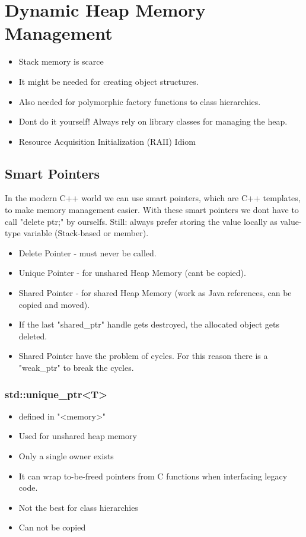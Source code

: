 \section{Dynamic Heap Memory Management}
\begin{itemize}
  \itemsep -0.5em 
  \item Stack memory is scarce
  \item It might be needed for creating object structures.
  \item Also needed for polymorphic factory functions to class hierarchies.
  \item Dont do it yourself! Always rely on library classes for managing the heap.
  \item Resource Acquisition Initialization (RAII) Idiom
\end{itemize}

\subsection{Smart Pointers}
In the modern C++ world we can use smart pointers, which are C++ templates, to make memory management easier. With these smart pointers we dont have to call "delete ptr;" by ourselfs. Still: always prefer storing the value locally as value-type variable (Stack-based or member).
\begin{itemize}
  \itemsep -0.5em 
  \item Delete Pointer - must never be called.
  \item Unique Pointer - for unshared Heap Memory (cant be copied).
  \item Shared Pointer - for shared Heap Memory (work as Java references, can be copied and moved).
  \item If the last "shared\_ptr" handle gets destroyed, the allocated object gets deleted.
  \item Shared Pointer have the problem of cycles. For this reason there is a "weak\_ptr" to break the cycles.
\end{itemize}


\subsubsection{std::unique\_ptr<T>}
\begin{itemize}
  \itemsep -0.5em 
  \item defined in "<memory>"
  \item Used for unshared heap memory
  \item Only a single owner exists
  \item It can wrap to-be-freed pointers from C functions when interfacing legacy code.
  \item Not the best for class hierarchies
  \item Can not be copied
\end{itemize}

